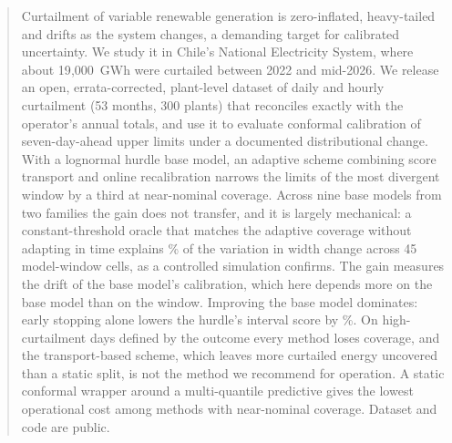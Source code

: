 \begin{abstract}
Curtailment of variable renewable generation is zero-inflated, heavy-tailed and drifts as the system changes, a demanding target for calibrated uncertainty. We study it in Chile's National Electricity System, where about 19{,}000~GWh were curtailed between 2022 and mid-2026. We release an open, errata-corrected, plant-level dataset of daily and hourly curtailment (53 months, 300 plants) that reconciles exactly with the operator's annual totals, and use it to evaluate conformal calibration of seven-day-ahead upper limits under a documented distributional change. With a lognormal hurdle base model, an adaptive scheme combining score transport and online recalibration narrows the limits of the most divergent window by a third at near-nominal coverage. Across nine base models from two families the gain does not transfer, and it is largely mechanical: a constant-threshold oracle that matches the adaptive coverage without adapting in time explains \% of the variation in width change across 45 model-window cells, as a controlled simulation confirms. The gain measures the drift of the base model's calibration, which here depends more on the base model than on the window. Improving the base model dominates: early stopping alone lowers the hurdle's interval score by \%. On high-curtailment days defined by the outcome every method loses coverage, and the transport-based scheme, which leaves more curtailed energy uncovered than a static split, is not the method we recommend for operation. A static conformal wrapper around a multi-quantile predictive gives the lowest operational cost among methods with near-nominal coverage. Dataset and code are public.
\end{abstract}

